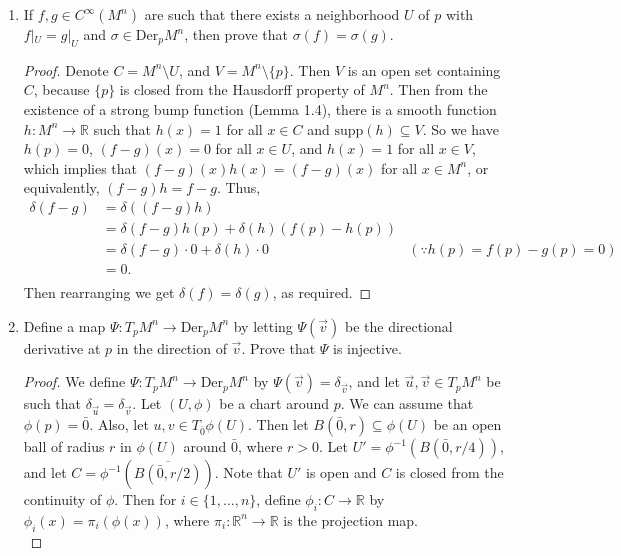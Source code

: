 \documentclass{article}
\begin{document}
\begin{enumerate}[label={\bf Q\arabic*:}]
\begin{enumerate}
      \item If $f,g\in C^\infty(M^n)$ are such that there exists a
        neighborhood $U$ of $p$ with $f|_U=g|_U$ and
        $\sigma\in\text{Der}_pM^n$, then prove that $\sigma(f)=\sigma(g)$.
        \begin{proof}
          Denote $C=M^n\setminus U$, and $V=M^n\setminus\{p\}$. Then $V$
          is an open set containing $C$, because $\{p\}$ is closed from the
          Hausdorff property of $M^n$. Then from the existence of a strong
          bump function (Lemma 1.4), there is a smooth function
          $h:M^n\rightarrow\mathbb{R}$ such that $h(x)=1$ for all $x\in C$
          and $\text{supp}(h)\subseteq V$. So we have $h(p)=0$, $(f-g)(x)=0$
          for all $x\in U$, and $h(x)=1$ for all $x\in V$, which implies that
          $(f-g)(x)h(x)=(f-g)(x)$ for all $x\in M^n$, or equivalently,
          $(f-g)h=f-g$. Thus,
          \begin{align*}
            \delta(f-g) &=\delta((f-g)h) \\
              &=\delta(f-g)h(p)+\delta(h)(f(p)-h(p)) \\
              &=\delta(f-g)\cdot0+\delta(h)\cdot0 & (\because
                h(p)=f(p)-g(p)=0) \\
              &=0. \\
          \end{align*}
          Then rearranging we get $\delta(f)=\delta(g)$, as required.
        \end{proof}

      \item Define a map $\Psi:T_pM^n\to\text{Der}_pM^n$ by letting
        $\Psi(\vec{v})$ be the directional derivative at $p$ in the direction
        of $\vec{v}$. Prove that $\Psi$ is injective.
        \begin{proof}
          We define $\Psi:T_pM^n\rightarrow\text{Der}_pM^n$ by
          $\Psi(\vec{v})=\delta_{\vec{v}}$, and let $\vec{u},\vec{v}\in
          T_pM^n$ be such that $\delta_{\vec{u}}=\delta_{\vec{v}}$. Let
          $(U,\phi)$ be a chart around $p$. We can assume that
          $\phi(p)=\bar{0}$. Also, let $u,v\in T_{\bar{0}}\phi(U)$. Then let
          $B(\bar{0},r)\subseteq\phi(U)$ be an open ball of radius $r$ in
          $\phi(U)$ around $\bar{0}$, where $r>0$. Let
          $U'=\phi^{-1}(B(\bar{0},r/4))$, and let
          $C=\phi^{-1}(\overline{B(\bar{0},r/2)})$. Note that $U'$ is open
          and $C$ is closed from the continuity of $\phi$. Then for
          $i\in\{1,\ldots,n\}$, define $\phi_i:C\rightarrow\mathbb{R}$ by
          $\phi_i(x)=\pi_i(\phi(x))$, where
          $\pi_i:\mathbb{R}^n\rightarrow\mathbb{R}$ is the projection map. \\


\end{proof}
\end{enumerate}
\end{enumerate}
\end{document}

